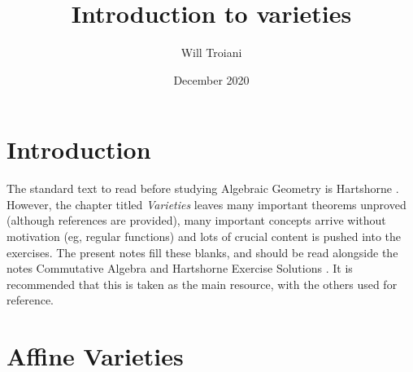 \documentclass[12pt]{article}
\title{Introduction to varieties}
\author{Will Troiani}
\date{December 2020}
\theoremstyle{plain}
\theoremstyle{definition}
\begin{document}
\maketitle
\tableofcontents
\section{Introduction}
The standard text to read before studying Algebraic Geometry is Hartshorne \cite{hartshorne}. However, the chapter titled \emph{Varieties} leaves many important theorems unproved (although references are provided), many important concepts arrive without motivation (eg, regular functions) and lots of crucial content is pushed into the exercises. The present notes fill these blanks, and should be read alongside the notes Commutative Algebra \cite{algebra} and Hartshorne Exercise Solutions \cite{hartshorne_solutions}. It is recommended that this is taken as the main resource, with the others used for reference.
\section{Affine Varieties}
\end{document}

